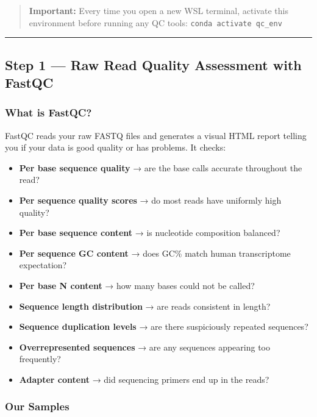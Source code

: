 \documentclass[
]{article}
\providecommand{\tightlist}{%
  \setlength{\itemsep}{0pt}\setlength{\parskip}{0pt}}
\begin{document}
\begin{quote}
\textbf{Important:} Every time you open a new WSL terminal, activate
this environment before running any QC tools:
\texttt{conda\ activate\ qc\_env}
\end{quote}

\begin{center}\rule{0.5\linewidth}{0.5pt}\end{center}

\subsection{Step 1 --- Raw Read Quality Assessment with
FastQC}\label{step-1-raw-read-quality-assessment-with-fastqc}

\subsubsection{What is FastQC?}\label{what-is-fastqc}

FastQC reads your raw FASTQ files and generates a visual HTML report
telling you if your data is good quality or has problems. It checks:

\begin{itemize}
\tightlist
\item
  \textbf{Per base sequence quality} → are the base calls accurate
  throughout the read?
\item
  \textbf{Per sequence quality scores} → do most reads have uniformly
  high quality?
\item
  \textbf{Per base sequence content} → is nucleotide composition
  balanced?
\item
  \textbf{Per sequence GC content} → does GC\% match human transcriptome
  expectation?
\item
  \textbf{Per base N content} → how many bases could not be called?
\item
  \textbf{Sequence length distribution} → are reads consistent in
  length?
\item
  \textbf{Sequence duplication levels} → are there suspiciously repeated
  sequences?
\item
  \textbf{Overrepresented sequences} → are any sequences appearing too
  frequently?
\item
  \textbf{Adapter content} → did sequencing primers end up in the reads?
\end{itemize}

\subsubsection{Our Samples}\label{our-samples}
\end{document}
